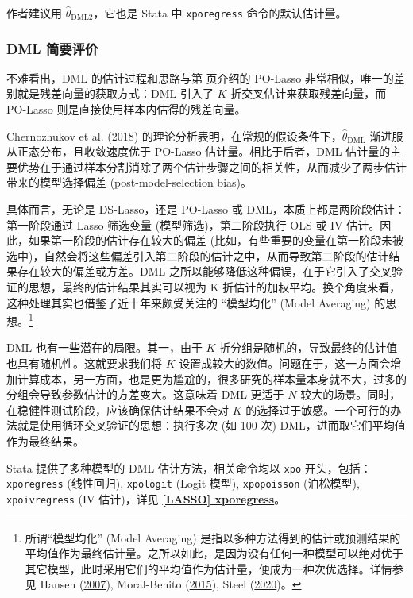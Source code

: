 {作者建议用 $\widehat{\theta}_{\mathrm{DML2}}$，它也是 Stata 中 \texttt{xporegress} 命令的默认估计量。 

\subsubsection{DML 简要评价}
不难看出，DML 的估计过程和思路与第 \pageref{page:lasso-polasso} 页介绍的 PO-Lasso 非常相似，唯一的差别就是残差向量的获取方式：DML 引入了 $K$-折交叉估计来获取残差向量，而 PO-Lasso 则是直接使用样本内估得的残差向量。

Chernozhukov et al. (2018) 的理论分析表明，在常规的假设条件下，$\widehat{\theta}_{\mathrm{DML}}$ 渐进服从正态分布，且收敛速度优于 PO-Lasso 估计量。相比于后者，DML 估计量的主要优势在于通过样本分割消除了两个估计步骤之间的相关性，从而减少了两步估计带来的模型选择偏差 (post-model-selection bias)。

具体而言，无论是 DS-Lasso，还是 PO-Lasso 或 DML，本质上都是两阶段估计：第一阶段通过  Lasso 筛选变量 (模型筛选)，第二阶段执行 OLS 或 IV 估计。因此，如果第一阶段的估计存在较大的偏差 (比如，有些重要的变量在第一阶段未被选中)，自然会将这些偏差引入第二阶段的估计之中，从而导致第二阶段的估计结果存在较大的偏差或方差。DML 之所以能够降低这种偏误，在于它引入了交叉验证的思想，最终的估计结果其实可以视为 K 折估计的加权平均。换个角度来看，这种处理其实也借鉴了近十年来颇受关注的 “模型均化” (Model Averaging) 的思想。\footnote{%
  所谓“模型均化” (Model Averaging) 是指以多种方法得到的估计或预测结果的平均值作为最终估计量。之所以如此，是因为没有任何一种模型可以绝对优于其它模型，此时采用它们的平均值作为估计量，便成为一种次优选择。详情参见 Hansen (\href{http://sci-hub.ren/10.1111/j.1468-0262.2007.00785.x}{2007}), Moral-Benito (\href{http://sci-hub.ren/10.1111/joes.12044}{2015}), Steel (\href{http://sci-hub.ren/10.1257/jel.20191385}{2020})。}

DML 也有一些潜在的局限。其一，由于 $K$ 折分组是随机的，导致最终的估计值也具有随机性。这就要求我们将 $K$ 设置成较大的数值。问题在于，这一方面会增加计算成本，另一方面，也是更为尴尬的，很多研究的样本量本身就不大，过多的分组会导致参数估计的方差变大。这意味着 DML 更适于 $N$ 较大的场景。同时，在稳健性测试阶段，应该确保估计结果不会对 $K$ 的选择过于敏感。一个可行的办法就是使用循环交叉验证的思想：执行多次 (如 100 次) DML，进而取它们平均值作为最终结果。


Stata 提供了多种模型的 DML 估计方法，相关命令均以 \texttt{xpo} 开头，包括：\texttt{xporegress} (线性回归), \texttt{xpologit} (Logit 模型), \texttt{xpopoisson} (泊松模型), \texttt{xpoivregress} (IV 估计)，详见 \href{https://www.stata.com/manuals/lassoxporegress.pdf}{\bfseries{[\MakeUppercase{lasso}] xporegress}}。

}
